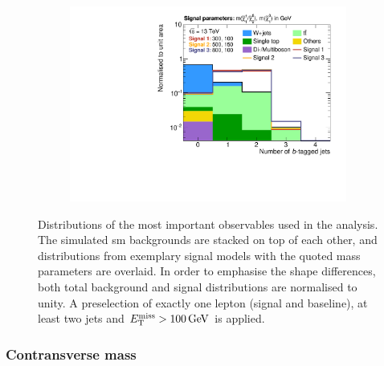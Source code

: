 \begin{figure}
\begin{subfigure}[b]{0.49\linewidth}
		\centering\includegraphics[width=\textwidth]{presel/nBJet}
		\caption{\label{fig:norm_nbjet}}
	\end{subfigure}
	\caption{Distributions of the most important observables used in the analysis. The simulated \gls{sm} backgrounds are stacked on top of each other, and distributions from exemplary signal models with the quoted mass parameters are overlaid. In order to emphasise the shape differences, both total background and signal distributions are normalised to unity. A preselection of exactly one lepton (signal and baseline), at least two jets and $\etmiss > \SI{100}{\GeV}$ is applied.}\label{fig:norm_obs}
\end{figure}

\subsubsection{Contransverse mass}

